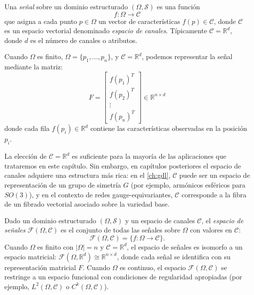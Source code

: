 \begin{definition}[Señal]\label{def:senal}
Una \textit{señal} sobre un dominio estructurado $(\Omega, \mathcal{S})$ es una función
\[
f: \Omega \to \mathcal{C}
\]
que asigna a cada punto $p \in \Omega$ un vector de características $f(p) \in \mathcal{C}$, donde $\mathcal{C}$ es un espacio vectorial denominado \textit{espacio de canales}. Típicamente $\mathcal{C} = \mathbb{R}^d$, donde $d$ es el número de canales o atributos.

Cuando $\Omega$ es finito, $\Omega = \{p_1, \ldots, p_n\}$, y $\mathcal{C} = \mathbb{R}^d$, podemos representar la señal mediante la matriz:
\[
F = \begin{bmatrix}
	f(p_1)^T \\
	f(p_2)^T \\
	\vdots \\
	f(p_n)^T
\end{bmatrix} \in \mathbb{R}^{n \times d}
\]
donde cada fila $f(p_i) \in \mathbb{R}^d$ contiene las características observadas en la posición $p_i$.
\end{definition}

\begin{remark}\label{rem:espacio_canales_general}
La elección de $\mathcal{C} = \mathbb{R}^d$ es suficiente para la mayoría de las aplicaciones que trataremos en este capítulo. Sin embargo, en capítulos posteriores el espacio de canales adquiere una estructura más rica: en el \autoref{ch:gdl}, $\mathcal{C}$ puede ser un espacio de representación de un grupo de simetría $G$ (por ejemplo, armónicos esféricos para $SO(3)$), y en el contexto de redes gauge-equivariantes, $\mathcal{C}$ corresponde a la fibra de un fibrado vectorial asociado sobre la variedad base.
\end{remark}

\begin{definition}\label{def:espacio_senales}
Dado un dominio estructurado $(\Omega, \mathcal{S})$ y un espacio de canales $\mathcal{C}$, el \textit{espacio de señales} $\mathcal{F}(\Omega, \mathcal{C})$ es el conjunto de todas las señales sobre $\Omega$ con valores en $\mathcal{C}$:
\[
\mathcal{F}(\Omega, \mathcal{C}) = \{f: \Omega \to \mathcal{C}\}.
\]
Cuando $\Omega$ es finito con $|\Omega| = n$ y $\mathcal{C} = \mathbb{R}^d$, el espacio de señales es isomorfo a un espacio matricial: $\mathcal{F}(\Omega, \mathbb{R}^d) \cong \mathbb{R}^{n \times d}$, donde cada señal se identifica con su representación matricial $F$. Cuando $\Omega$ es continuo, el espacio $\mathcal{F}(\Omega, \mathcal{C})$ se restringe a un espacio funcional con condiciones de regularidad apropiadas (por ejemplo, $L^2(\Omega, \mathcal{C})$ o $C^k(\Omega, \mathcal{C})$).
\end{definition}

